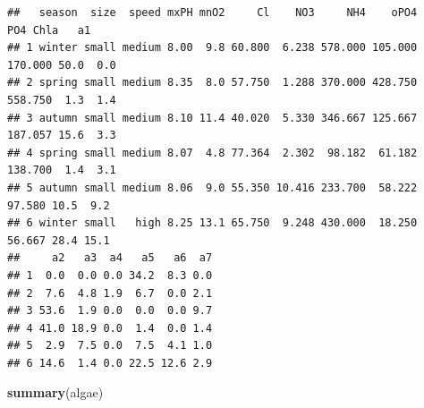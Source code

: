 \documentclass[
]{book}
\newenvironment{Shaded}{\begin{snugshade}}{\end{snugshade}}
\newcommand{\FunctionTok}[1]{\textcolor[rgb]{0.13,0.29,0.53}{\textbf{#1}}}
\newcommand{\NormalTok}[1]{#1}
\theoremstyle{plain}
\theoremstyle{definition}
\theoremstyle{definition}
\theoremstyle{definition}
\theoremstyle{definition}
\theoremstyle{definition}
\theoremstyle{remark}
\begin{document}
\begin{verbatim}
##   season  size  speed mxPH mnO2     Cl    NO3     NH4    oPO4     PO4 Chla   a1
## 1 winter small medium 8.00  9.8 60.800  6.238 578.000 105.000 170.000 50.0  0.0
## 2 spring small medium 8.35  8.0 57.750  1.288 370.000 428.750 558.750  1.3  1.4
## 3 autumn small medium 8.10 11.4 40.020  5.330 346.667 125.667 187.057 15.6  3.3
## 4 spring small medium 8.07  4.8 77.364  2.302  98.182  61.182 138.700  1.4  3.1
## 5 autumn small medium 8.06  9.0 55.350 10.416 233.700  58.222  97.580 10.5  9.2
## 6 winter small   high 8.25 13.1 65.750  9.248 430.000  18.250  56.667 28.4 15.1
##     a2   a3  a4   a5   a6  a7
## 1  0.0  0.0 0.0 34.2  8.3 0.0
## 2  7.6  4.8 1.9  6.7  0.0 2.1
## 3 53.6  1.9 0.0  0.0  0.0 9.7
## 4 41.0 18.9 0.0  1.4  0.0 1.4
## 5  2.9  7.5 0.0  7.5  4.1 1.0
## 6 14.6  1.4 0.0 22.5 12.6 2.9
\end{verbatim}

\begin{Shaded}
\begin{Highlighting}[]
\FunctionTok{summary}\NormalTok{(algae)}
\end{Highlighting}
\end{Shaded}
\end{document}
